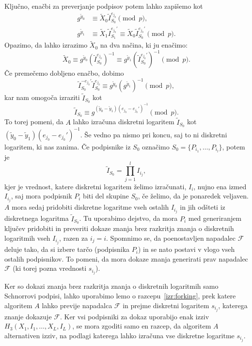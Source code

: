 \documentclass[isrm2, tisk]{fmfdelo}
\begin{document}
Ključno, enačbi za preverjanje podpisov potem lahko zapišemo kot
\begin{align*}
    g^{\tilde{y}_0} &\equiv \tilde{X}_0 \tilde{I}_{S_0}^{e_{j_0}} \pmod p, \\
    g^{\tilde{y}_1} &\equiv \tilde{X}_1 \tilde{I}_{S_1}^{e_{j_0}'}
        \equiv \tilde{X}_0 \tilde{I}_{S_0}^{e_{j_0}'} \pmod p.
\end{align*}
Opazimo, da lahko izrazimo $\tilde{X}_0$ na dva načina, ki ju enačimo:
$$
\tilde{X}_0 \equiv g^{\tilde{y}_0}(\tilde{I}_{S_0}^{e_{j_0}})^{-1}
    \equiv g^{\tilde{y}_1}(\tilde{I}_{S_0}^{e_{j_0}'})^{-1} \pmod p.
$$
Če premečemo dobljeno enačbo, dobimo
$$
\tilde{I}_{S_0}^{- e_{j_0}'} \tilde{I}_{S_0}^{e_{j_0}} \equiv g^{\tilde{y}_0}(g^{\tilde{y}_1})^{-1} \pmod p,
$$
kar nam omogoča izraziti $\tilde{I}_{S_0}$ kot
$$
\tilde{I}_{S_0} \equiv g^{(\tilde{y}_0 - \tilde{y}_1) (e_{j_0} - e_{j_0}')^{-1}} \pmod p.
$$
To torej pomeni, da $A$ lahko izračuna diskretni logaritem $\tilde{I}_{S_0}$ kot 
$(\tilde{y}_0 - \tilde{y}_1) (e_{j_0} - e_{j_0}')^{-1}$. Še vedno pa nismo pri koncu, saj to ni
diskretni logaritem, ki nas zanima. Če podpisnike iz $S_0$ označimo $S_0 = \{P_{i_1}, \dots, P_{i_l}\}$,
potem je 
$$
\tilde{I}_{S_0} = \prod_{j=1}^l I_{i_j},
$$
kjer je vrednost, katere diskretni logaritem želimo izračunati, $I_i$, nujno ena izmed $I_{i_j}$,
saj mora podpisnik $P_i$ biti del skupine $S_0$, če želimo, da je ponaredek veljaven. $A$ mora sedaj
pridobiti diskretne logaritme vseh ostalih $I_{i_j}$ in jih odšteti iz diskretnega logaritma
$\tilde{I}_{S_0}$. Tu uporabimo dejstvo, da mora $P_i$ med generiranjem ključev pridobiti in preveriti
dokaze znanja brez razkritja znanja o diskretnih logaritmih vseh $I_{i_j}$, razen za $i_j = i$.
Spomnimo se, da poenostavljen napadalec $\mathcal{F}$ deluje tako, da si izbere tarčo (podpisnika $P_i$)
in se nato postavi v vlogo vseh ostalih podpisnikov. To pomeni, da mora dokaze znanja generirati
prav napadalec $\mathcal{F}$ (ki torej pozna vrednosti $s_{i_j}$).

Ker so dokazi znanja brez razkritja znanja o diskretnih logaritmih samo Schnorrovi podpisi, lahko
uporabimo lemo o razcepu~\ref{izr:forking}, prek katere algoritem $A$ lahko previje napadalca
$\mathcal{F}$ in prejme diskretni logaritem $s_{i_j}$, katerega znanje dokazuje $\mathcal{F}$.
Ker vsi podpisniki za dokaz uporabijo enak izziv $H_3(X_1, I_1, \dots, X_L, I_L)$, se
mora zgoditi samo en razcep, da algoritem $A$ alternativen izziv, na podlagi katerega lahko
izračuna vse diskretne logaritme $s_{i_j}$.
\end{document}

